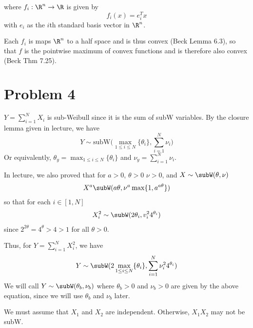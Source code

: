 \documentclass{homework}
\begin{document}
where $f_i: \R^n \to \R$ is given by
\begin{equation*}
    f_i(x) = e_i^T x
\end{equation*}
with $e_i$ as the $i$th standard basis vector in $\R^n$.

Each $f_i$ is maps $\R^n$ to a half space and is thus convex (Beck Lemma 6.3), so that $f$ is the
pointwise maximum of convex functions and is therefore also convex (Beck Thm 7.25).

\section{Problem 4}

\begin{letterenum}
\item $Y = \sum_{i=1}^{N} X_i$ is sub-Weibull since it is the sum of subW variables.
    By the closure lemma given in lecture, we have
    \begin{equation*}
        Y \sim \text{subW} \biggl(\max_{1\leq i \leq N} \{\theta_i\},
            \sum_{i=1}^{N} \nu_i\biggr)
    \end{equation*}
    Or equivalently, $\theta_y = \max_{1 \leq i \leq N} \{\theta_i\}$ and
    $\nu_y = \sum_{i=1}^N \nu_i$.

\item In lecture, we also proved that for $a>0$, $\theta > 0$ $\nu > 0$, and $X \sim \subW (\theta, \nu)$
\begin{equation}
    X^a \subW (a \theta, \nu^a \max\{1, a^{a\theta}\})
    \label{eq:subW-x-to-a}
\end{equation}
so that for each $i \in [1, N]$
\begin{equation}
    X_i^2 \sim \subW(2 \theta_i, v_i^2 4^{\theta_i})
    \label{eq:sub-x-squared}
\end{equation}
since $2^{2\theta} = 4^\theta > 4 > 1$ for all $\theta > 0$.

Thus, for $Y = \sum_{i=1}^{N} X_i^2$, we have
\begin{equation}
    Y \sim \subW ( 2 \max_{1\leq i \leq N} \{\theta_i\}, \sum_{i=1}^{N} \nu_i^2 4^{\theta_i})
    \label{eq:sum-x-squared}
\end{equation}
We will call $Y \sim \subW (\theta_b, \nu_b)$ where $\theta_b > 0$ and $\nu_b > 0$ are given by the
above equation, since we will use $\theta_b$ and $\nu_b$ later.

\item We must assume that $X_1$ and $X_2$ are independent. Otherwise, $X_1X_2$ may not be subW.


\end{letterenum}
\end{document}
